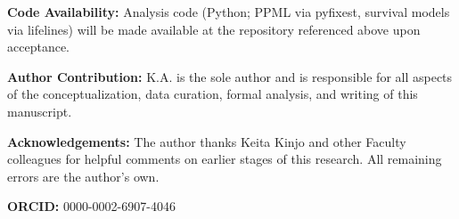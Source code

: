 \documentclass[12pt]{article}
\begin{document}
\vspace{0.3cm}
\noindent \textbf{Code Availability:} Analysis code (Python; PPML via pyfixest, survival models via lifelines) will be made available at the repository referenced above upon acceptance.

\vspace{0.3cm}
\noindent \textbf{Author Contribution:} K.A. is the sole author and is responsible for all aspects of the conceptualization, data curation, formal analysis, and writing of this manuscript.

\vspace{0.3cm}
\noindent \textbf{Acknowledgements:} The author thanks Keita Kinjo and other Faculty colleagues for helpful comments on earlier stages of this research. All remaining errors are the author's own.

\vspace{0.3cm}
\noindent \textbf{ORCID:} 0000-0002-6907-4046
\end{document}

